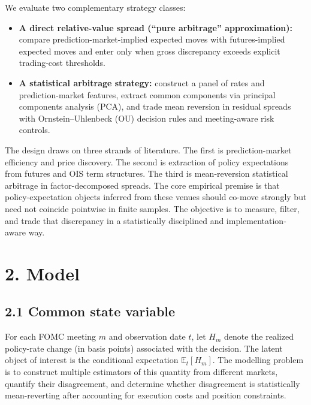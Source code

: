 We evaluate two complementary strategy classes:
\begin{itemize}
    \item \textbf{A direct relative-value spread (``pure arbitrage'' approximation):} compare prediction-market-implied expected moves with futures-implied expected moves and enter only when gross discrepancy exceeds explicit trading-cost thresholds.
    \item \textbf{A statistical arbitrage strategy:} construct a panel of rates and prediction-market features, extract common components via principal components analysis (PCA), and trade mean reversion in residual spreads with Ornstein--Uhlenbeck (OU) decision rules and meeting-aware risk controls.
\end{itemize}

The design draws on three strands of literature. The first is prediction-market efficiency and price discovery. The second is extraction of policy expectations from futures and OIS term structures. The third is mean-reversion statistical arbitrage in factor-decomposed spreads. The core empirical premise is that policy-expectation objects inferred from these venues should co-move strongly but need not coincide pointwise in finite samples. The objective is to measure, filter, and trade that discrepancy in a statistically disciplined and implementation-aware way.



\section*{2. Model}

\subsection*{2.1 Common state variable}

For each FOMC meeting $m$ and observation date $t$, let $H_m$ denote the realized policy-rate change (in basis points) associated with the decision. The latent object of interest is the conditional expectation $\mathbb{E}_t[H_m]$. The modelling problem is to construct multiple estimators of this quantity from different markets, quantify their disagreement, and determine whether disagreement is statistically mean-reverting after accounting for execution costs and position constraints.

